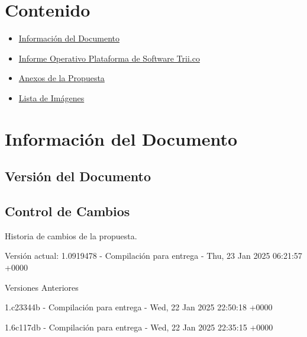 \documentclass[
  paper=a4,
  ,captions=tableheading
]{scrartcl}
\providecommand{\tightlist}{%
  \setlength{\itemsep}{0pt}\setlength{\parskip}{0pt}}
\renewenvironment{quote}{\begin{customblockquote}\list{}{\rightmargin=0em\leftmargin=0em}%
\item\relax\color{blockquote-text}\ignorespaces}{\unskip\unskip\endlist\end{customblockquote}}
\begin{document}



\section{Contenido}\label{sec:contenido}

\begin{itemize}
\tightlist
\item
  \hyperref[informaciuxf3n-del-documento]{Información del Documento}
\item
  \hyperref[informe-operativo-plataforma-de-software-trii.co]{Informe
  Operativo Plataforma de Software Trii.co}
\item
  \hyperref[anexos-de-la-propuesta]{Anexos de la Propuesta}
\item
  \hyperref[lista-de-imuxe1genes]{Lista de Imágenes}
\end{itemize}

\newpage

\section{Información del
Documento}\label{sec:informaciuxf3n-del-documento}

\subsection{Versión del Documento}\label{sec:versiuxf3n-del-documento}

\begin{quote}
\end{quote}

\subsection{Control de Cambios}\label{sec:control-de-cambios}

Historia de cambios de la propuesta.

Versión actual: 1.0919478 - Compilación para entrega - Thu, 23 Jan 2025
06:21:57 +0000

Versiones Anteriores

1.c23344b - Compilación para entrega - Wed, 22 Jan 2025 22:50:18 +0000

1.6c117db - Compilación para entrega - Wed, 22 Jan 2025 22:35:15 +0000
\end{document}
